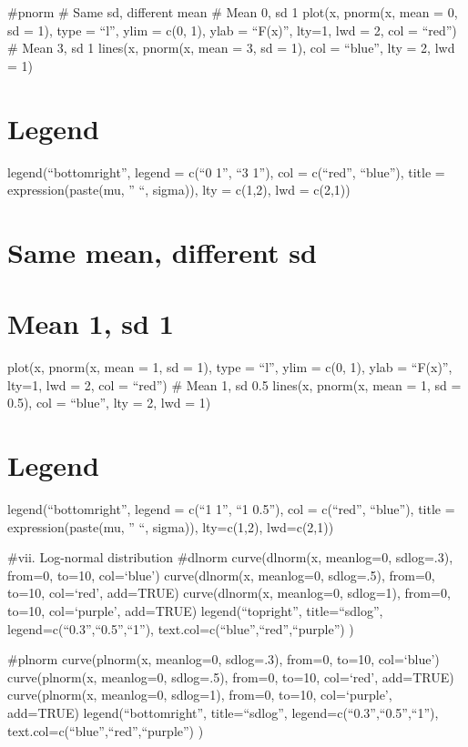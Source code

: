 \documentclass[
]{article}
\begin{document}
\#pnorm \# Same sd, different mean \# Mean 0, sd 1 plot(x, pnorm(x, mean
= 0, sd = 1), type = ``l'', ylim = c(0, 1), ylab = ``F(x)'', lty=1, lwd
= 2, col = ``red'') \# Mean 3, sd 1 lines(x, pnorm(x, mean = 3, sd = 1),
col = ``blue'', lty = 2, lwd = 1)

\hypertarget{legend-2}{%
\section{Legend}\label{legend-2}}

legend(``bottomright'', legend = c(``0 1'', ``3 1''), col = c(``red'',
``blue''), title = expression(paste(mu, '' ``, sigma)), lty = c(1,2),
lwd = c(2,1))

\hypertarget{same-mean-different-sd-1}{%
\section{Same mean, different sd}\label{same-mean-different-sd-1}}

\hypertarget{mean-1-sd-1-2}{%
\section{Mean 1, sd 1}\label{mean-1-sd-1-2}}

plot(x, pnorm(x, mean = 1, sd = 1), type = ``l'', ylim = c(0, 1), ylab =
``F(x)'', lty=1, lwd = 2, col = ``red'') \# Mean 1, sd 0.5 lines(x,
pnorm(x, mean = 1, sd = 0.5), col = ``blue'', lty = 2, lwd = 1)

\hypertarget{legend-3}{%
\section{Legend}\label{legend-3}}

legend(``bottomright'', legend = c(``1 1'', ``1 0.5''), col = c(``red'',
``blue''), title = expression(paste(mu, '' ``, sigma)), lty=c(1,2),
lwd=c(2,1))

\#vii. Log-normal distribution \#dlnorm curve(dlnorm(x, meanlog=0,
sdlog=.3), from=0, to=10, col=`blue') curve(dlnorm(x, meanlog=0,
sdlog=.5), from=0, to=10, col=`red', add=TRUE) curve(dlnorm(x,
meanlog=0, sdlog=1), from=0, to=10, col=`purple', add=TRUE)
legend(``topright'', title=``sdlog'', legend=c(``0.3'',``0.5'',``1''),
text.col=c(``blue'',``red'',``purple'') )

\#plnorm curve(plnorm(x, meanlog=0, sdlog=.3), from=0, to=10,
col=`blue') curve(plnorm(x, meanlog=0, sdlog=.5), from=0, to=10,
col=`red', add=TRUE) curve(plnorm(x, meanlog=0, sdlog=1), from=0, to=10,
col=`purple', add=TRUE) legend(``bottomright'', title=``sdlog'',
legend=c(``0.3'',``0.5'',``1''), text.col=c(``blue'',``red'',``purple'')
)
\end{document}
